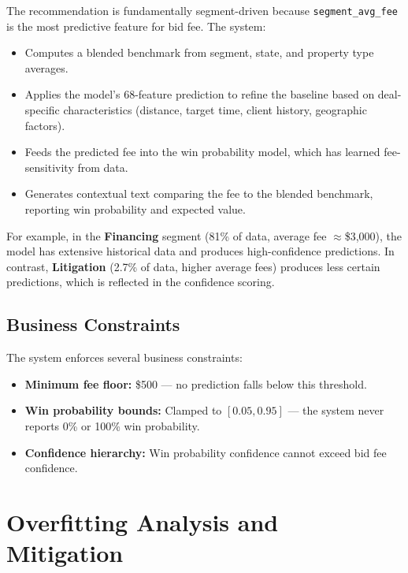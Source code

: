\documentclass[12pt,a4paper]{article}
\begin{document}
The recommendation is fundamentally segment-driven because \texttt{segment\_avg\_fee} is the most predictive feature for bid fee. The system:

\begin{itemize}[nosep]
    \item Computes a blended benchmark from segment, state, and property type averages.
    \item Applies the model's 68-feature prediction to refine the baseline based on deal-specific characteristics (distance, target time, client history, geographic factors).
    \item Feeds the predicted fee into the win probability model, which has learned fee-sensitivity from data.
    \item Generates contextual text comparing the fee to the blended benchmark, reporting win probability and expected value.
\end{itemize}

For example, in the \textbf{Financing} segment (81\% of data, average fee $\approx$\$3,000), the model has extensive historical data and produces high-confidence predictions. In contrast, \textbf{Litigation} (2.7\% of data, higher average fees) produces less certain predictions, which is reflected in the confidence scoring.

\subsection{Business Constraints}

The system enforces several business constraints:

\begin{itemize}[nosep]
    \item \textbf{Minimum fee floor:} \$500 --- no prediction falls below this threshold.
    \item \textbf{Win probability bounds:} Clamped to $[0.05, 0.95]$ --- the system never reports 0\% or 100\% win probability.
    \item \textbf{Confidence hierarchy:} Win probability confidence cannot exceed bid fee confidence.
\end{itemize}

\section{Overfitting Analysis and Mitigation}
\end{document}

